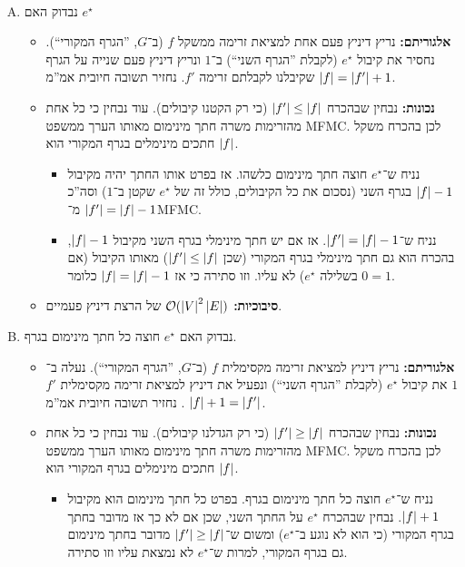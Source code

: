 \documentclass[]{article}
\newcommand\str {^{\star}}
\begin{document}
	\newpage \ \newpage 
	\begin{enumerate}[(A)]
		\item נבדוק האם $e\str$
		\begin{itemize}
			\item \textbf{אלגוריתם: }נריץ דיניץ פעם אחת למציאת זרימה ממשקל $f$ (ב־$G$, ''הגרף המקורי``). נחסיר את קיבול $e\str$ (לקבלת ''הגרף השני``) ב־$1$ ונריץ דיניץ פעם שנייה על הגרף שקיבלנו לקבלתם זרימה $f'$. נחזיר תשובה חיובית אמ''מ $\left \lvert f \right \rvert = \left \lvert f' \right \rvert + 1$. 
			\item \textbf{נכונות: }נבחין שבהכרח $\left \lvert f' \right \rvert \le \left \lvert f \right \rvert$ (כי רק הקטנו קיבולים). עוד נבחין כי כל אחת מהזרימות משרה חתך מינימום מאותו הערך ממשפט MFMC. לכן בהכרח משקל חתכים מינימלים בגרף המקורי הוא $\left \lvert f \right \rvert$. 
			\begin{itemize}
				\item[$\implies$]נניח ש־$e\str$ חוצה חתך מינימום כלשהו. אז בפרט אותו החתך יהיה מקיבול $\left \lvert f \right \rvert - 1$ בגרף השני (נסכום את כל הקיבולים, כולל זה של $e\str$ שקטן ב־$1$) וסה''כ $\left \lvert f' \right \rvert = \left \lvert f \right \rvert - 1$ מ־MFMC. 
				\item[$\impliedby$]נניח ש־$\left \lvert f' \right \rvert = \left \lvert f \right \rvert - 1$. אז אם יש חתך מינימלי בגרף השני מקיבול $\left \lvert f \right \rvert - 1$, בהכרח הוא גם חתך מינימלי בגרף המקורי (שכן $\left \lvert f' \right \rvert \le \left \lvert f \right \rvert$) מאותו הקיבול (אם בשלילה $e\str$) לא עליו. וזו סתירה כי אז $\left \lvert f \right \rvert = \left \lvert f \right \rvert - 1$ כלומר $0 = 1$. 
			\end{itemize}
			\item \textbf{סיבוכיות: }$\mathcal{O}(\left \lvert V \right \rvert^2 \left \lvert E \right \rvert)$ של הרצת דיניץ פעמיים. 
		\end{itemize}
		\item נבדוק האם $e\str$ חוצה כל חתך מינימום בגרף. 
		\begin{itemize}
			\item \textbf{אלגוריתם: }נריץ דיניץ למציאת זרימה מקסימלית $f$ (ב־$G$, ''הגרף המקורי``). נעלה ב־$1$ את קיבול $e\str$ (לקבלת ''הגרף השני``) ונפעיל את דיניץ למציאת זרימה מקסימלית $f'$. נחזיר תשובה חיובית אמ''מ $\left \lvert f \right \rvert + 1= \left \lvert f' \right \rvert$. 
			\item \textbf{נכונות: }נבחין שבהכרח $\left \lvert f' \right \rvert \ge \left \lvert f \right \rvert$ (כי רק הגדלנו קיבולים). עוד נבחין כי כל אחת מהזרימות משרה חתך מינימום מאותו הערך ממשפט MFMC. לכן בהכרח משקל חתכים מינימלים בגרף המקורי הוא $\left \lvert f \right \rvert$. 
			\begin{itemize}
				\item[$\implies$] נניח ש־$e\str$ חוצה כל חתך מינימום בגרף. בפרט כל חתך מינימום הוא מקיבול $\left \lvert f \right \rvert + 1$. נבחין שבהכרח $e\str$ על החתך השני, שכן אם לא כך אז מדובר בחתך בגרף המקורי (כי הוא לא נוגע ב־$e\str$) ומשום ש־$\left \lvert f' \right \rvert \ge \left \lvert f \right \rvert$ מדובר בחתך מינימום גם בגרף המקורי, למרות ש־$e\str$ לא נמצאת עליו וזו סתירה. 

\end{itemize}
\end{itemize}
\end{enumerate}
\end{document}
